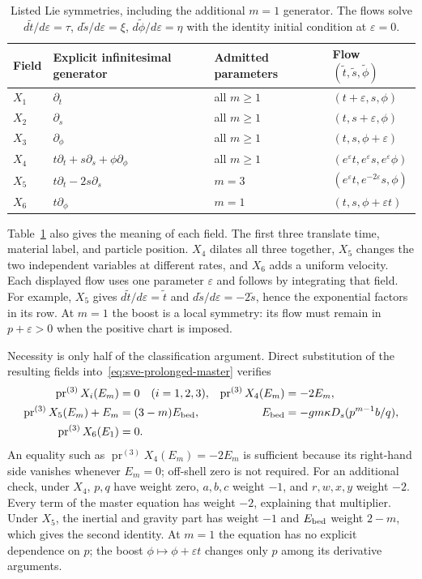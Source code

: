 \documentclass[11pt]{article}
\theoremstyle{definition}
\newcommand{\pr}{\operatorname{pr}}
\begin{document}
\begin{table}[htbp]
\centering\small
\begin{tabularx}{\linewidth}{@{}lXll@{}}
\toprule
Field & Explicit infinitesimal generator & Admitted parameters & Flow $(\widetilde t,\widetilde s,\widetilde\phi)$\\
\midrule
$X_1$ & $\partial_t$ & all $m\geq1$ & $(t+\varepsilon,s,\phi)$\\
$X_2$ & $\partial_s$ & all $m\geq1$ & $(t,s+\varepsilon,\phi)$\\
$X_3$ & $\partial_\phi$ & all $m\geq1$ & $(t,s,\phi+\varepsilon)$\\
$X_4$ & $t\partial_t+s\partial_s+\phi\partial_\phi$ & all $m\geq1$ & $(e^\varepsilon t,e^\varepsilon s,e^\varepsilon\phi)$\\
$X_5$ & $t\partial_t-2s\partial_s$ & $m=3$ & $(e^\varepsilon t,e^{-2\varepsilon}s,\phi)$\\
$X_6$ & $t\partial_\phi$ & $m=1$ & $(t,s,\phi+\varepsilon t)$\\
\bottomrule
\end{tabularx}
\caption{Listed Lie symmetries, including the additional $m=1$ generator.
The flows solve $d\widetilde t/d\varepsilon=\tau$,
$d\widetilde s/d\varepsilon=\xi$, $d\widetilde\phi/d\varepsilon=\eta$
with the identity initial condition at $\varepsilon=0$.}
\label{tab:sve-generators}
\end{table}

Table~\ref{tab:sve-generators} also gives the meaning of each field.
The first three translate time, material label, and particle position.
$X_4$ dilates all three together, $X_5$ changes the two independent
variables at different rates, and $X_6$ adds a uniform velocity.
Each displayed flow uses one parameter $\varepsilon$ and follows by
integrating that field. For example, $X_5$ gives
$d\widetilde t/d\varepsilon=\widetilde t$ and
$d\widetilde s/d\varepsilon=-2\widetilde s$, hence the exponential
factors in its row. At $m=1$ the boost is a local symmetry: its flow must
remain in $p+\varepsilon>0$ when the positive chart is imposed.

Necessity is only half of the classification argument. Direct substitution
of the resulting fields into~\eqref{eq:sve-prolonged-master} verifies
\begin{align}
 \pr^{(3)}X_i(E_m)&=0\quad(i=1,2,3),&
 \pr^{(3)}X_4(E_m)&=-2E_m,\notag\\
 \pr^{(3)}X_5(E_m)+E_m&=(3-m)E_{\rm bed},&
 E_{\rm bed}&=-gm\kappa D_s(p^{m-1}b/q),\notag\\
 \pr^{(3)}X_6(E_1)&=0.
 \label{eq:sve-offshell-certificates}
\end{align}
An equality such as $\pr^{(3)}X_4(E_m)=-2E_m$ is sufficient because its
right-hand side vanishes whenever $E_m=0$; off-shell zero is not required.
For an additional check, under $X_4$, $p,q$ have weight zero, $a,b,c$
weight $-1$, and $r,w,x,y$ weight $-2$. Every term of the master equation
has weight $-2$, explaining that multiplier. Under $X_5$, the inertial
and gravity part has weight $-1$ and $E_{\rm bed}$ weight $2-m$,
which gives the second identity. At $m=1$ the equation has no explicit
dependence on $p$; the boost $\phi\mapsto\phi+\varepsilon t$ changes
only $p$ among its derivative arguments.
\end{document}
